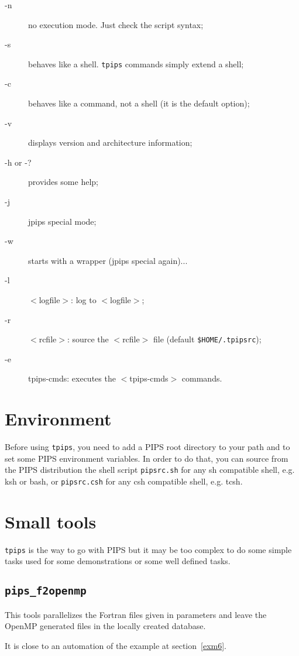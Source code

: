 \documentclass[a4paper,12pt]{article}
\begin{document}
\begin{description}

\item [-n]  no execution mode. Just check the script syntax;
\item [-s] behaves like a shell. {\tt tpips} commands simply extend a shell;
\item [-c] behaves like a command, not a shell (it is the default option);
\item [-v] displays version and architecture information;
\item [-h or -?] provides some help;
\item [-j] jpips special mode;
\item [-w] starts with a wrapper (jpips special again)...
\item [-l] $<$logfile$>$: log to $<$logfile$>$;
\item [-r] $<$rcfile$>$: source the $<$rcfile$>$ file (default
  \verb|$HOME/.tpipsrc|); %
\item [-e] tpips-cmds: executes the $<$tpips-cmds$>$ commands.
\end{description}


\section{Environment}

Before using {\tt tpips}, you need to add a PIPS root directory to your
path and to set some PIPS environment variables. In order to do that, you
can source from the PIPS distribution the shell script \texttt{pipsrc.sh}
for any sh compatible shell, e.g. ksh or bash, or \texttt{pipsrc.csh} for
any csh compatible shell, e.g.  tcsh.


\section{Small tools}
\label{sec:small-tools}

\texttt{tpips} is the way to go with PIPS but it may be too complex to do
some simple tasks used for some demonstrations or some well defined tasks.


\subsection{\texttt{pips\_f2openmp}}
\label{sec:pips_f2openmp}

This tools parallelizes the Fortran files given in parameters and leave
the OpenMP generated files in the locally created database.

It is close to an automation of the example at section~\ref{exm6}.
\end{document}
